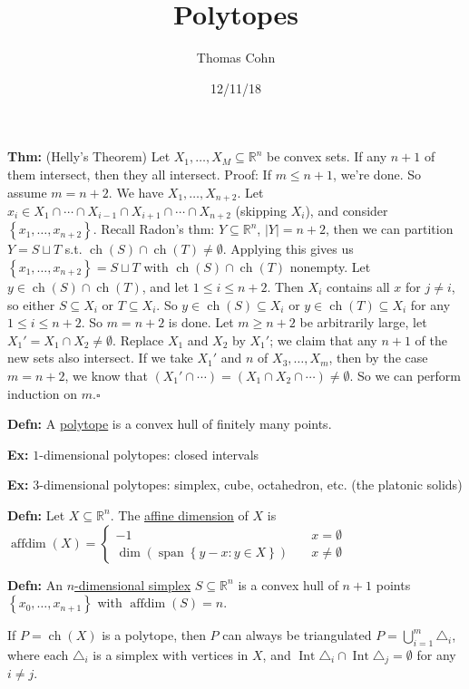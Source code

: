 \documentclass[10pt,letterpaper]{article}
\author{Thomas Cohn}
\title{Polytopes}
\date{12/11/18} %
\newcommand{\n}{\hfill\break}
\newcommand{\defn}[1]{\par\noindent\settowidth{\hangindent}{\textbf{Defn: }}\textbf{Defn: }#1\n}
\newcommand{\thm}[1]{\par\noindent\settowidth{\hangindent}{\textbf{Thm: }}\textbf{Thm: }#1\n}
\newcommand{\ex}[1]{\par\noindent\settowidth{\hangindent}{\textbf{Ex: }}\textbf{Ex: }#1\n}
\newcommand{\proven}{\;$\square$\n}
\newcommand{\card}[1]{\left|#1\right|}
\newcommand{\set}[1]{\left\{#1\right\}}
\newcommand{\reals}{\mathbb{R}}
\newcommand{\R}{\reals}
\DeclareMathOperator{\affdim}{affdim}
\newcommand{\tri}{\triangle}
\DeclareMathOperator{\vspan}{span}
\DeclareMathOperator{\Int}{Int}
\DeclareMathOperator{\ch}{ch}
\newcommand{\st}{s.t.}
\begin{document}
\maketitle
\setlength\RaggedRightParindent{\parindent}
\RaggedRight

\thm{(Helly's Theorem) Let $X_{1},\ldots,X_{M}\subseteq\R^{n}$ be convex sets.\n
If any $n+1$ of them intersect, then they all intersect.\n
Proof: If $m\le{}n+1$, we're done. So assume $m=n+2$. We have $X_{1},\ldots,X_{n+2}$.\n
Let $x_{i}\in{}X_{1}\cap\cdots\cap{}X_{i-1}\cap{}X_{i+1}\cap\cdots\cap{}X_{n+2}$ (skipping $X_{i}$), and consider $\set{x_{1},\ldots,x_{n+2}}$.\n
\n
Recall Radon's thm: $Y\subseteq\R^{n}$, $\card{Y}=n+2$, then we can partition $Y=S\sqcup{}T$ \st{} $\ch(S)\cap\ch(T)\ne\emptyset$. Applying this gives us $\set{x_{1},\ldots,x_{n+2}}=S\sqcup{}T$ with $\ch(S)\cap\ch(T)$ nonempty.\n
\n
Let $y\in\ch(S)\cap\ch(T)$, and let $1\le{}i\le{}n+2$. Then $X_{i}$ contains all $x$ for $j\ne{}i$, so either $S\subseteq{}X_{i}$ or $T\subseteq{}X_{i}$. So $y\in\ch(S)\subseteq{}X_{i}$ or $y\in\ch(T)\subseteq{}X_{i}$ for any $1\le{}i\le{}n+2$. So $m=n+2$ is done.\n
\n
Let $m\ge{}n+2$ be arbitrarily large, let $X_{1}'=X_{1}\cap{}X_{2}\ne\emptyset$. Replace $X_{1}$ and $X_{2}$ by $X_{1}'$; we claim that any $n+1$ of the new sets also intersect. If we take $X_{1}'$ and $n$ of $X_{3},\ldots,X_{m}$, then by the case $m=n+2$, we know that $(X_{1}'\cap\cdots)=(X_{1}\cap{}X_{2}\cap\cdots)\ne\emptyset$. So we can perform induction on $m$.\proven
}

\defn{A \underline{polytope} is a convex hull of finitely many points.}

\ex{$1$-dimensional polytopes: closed intervals}

\ex{$3$-dimensional polytopes: simplex, cube, octahedron, etc. (the platonic solids)}

\defn{Let $X\subseteq\R^{n}$. The \underline{affine dimension} of $X$ is $\affdim(X)=\left\{\begin{array}{ll}-1 & \quad{}x=\emptyset \\ \dim(\vspan\set{y-x:y\in{}X}) & \quad{}x\ne\emptyset\end{array}\right.$}

\defn{An \underline{$n$-dimensional simplex} $S\subseteq\R^{n}$ is a convex hull of $n+1$ points $\set{x_{0},\ldots,x_{n+1}}$ with $\affdim(S)=n$.}

\par\noindent If $P=\ch(X)$ is a polytope, then $P$ can always be triangulated $P=\bigcup_{i=1}^{m}\tri_{i}$, where each $\tri_{i}$ is a simplex with vertices in $X$, and $\Int\tri_{i}\cap\Int\tri_{j}=\emptyset$ for any $i\ne{}j$.
\end{document}

